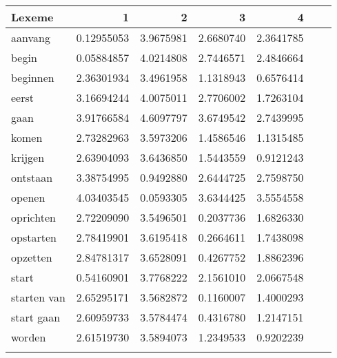\begin{tabularx}{\textwidth}{Xrrrrrr}
\lsptoprule
Lexeme        & 1         & 2          & 3         & 4         \\ \midrule
aanvang       & 0.12955053 & 3.9675981 & 2.6680740 & 2.3641785 \\
begin         & 0.05884857 & 4.0214808 & 2.7446571 & 2.4846664 \\          
beginnen      & 2.36301934 & 3.4961958 & 1.1318943 & 0.6576414 \\       
eerst         & 3.16694244 & 4.0075011 & 2.7706002 & 1.7263104 \\      
gaan          & 3.91766584 & 4.6097797 & 3.6749542 & 2.7439995 \\
komen         & 2.73282963 & 3.5973206 & 1.4586546 & 1.1315485 \\      
krijgen       & 2.63904093 & 3.6436850 & 1.5443559 & 0.9121243 \\  
ontstaan      & 3.38754995 & 0.9492880 & 2.6444725 & 2.7598750 \\      
openen        & 4.03403545 & 0.0593305 & 3.6344425 & 3.5554558 \\   
oprichten     & 2.72209090 & 3.5496501 & 0.2037736 & 1.6826330 \\
opstarten     & 2.78419901 & 3.6195418 & 0.2664611 & 1.7438098 \\  
opzetten      & 2.84781317 & 3.6528091 & 0.4267752 & 1.8862396 \\       
start         & 0.54160901 & 3.7768222 & 2.1561010 & 2.0667548 \\ 
starten van   & 2.65295171 & 3.5682872 & 0.1160007 & 1.4000293 \\
start gaan    & 2.60959733 & 3.5784474 & 0.4316780 & 1.2147151 \\
worden        & 2.61519730 & 3.5894073 & 1.2349533 & 0.9202239 \\
\lspbottomrule
\end{tabularx}

